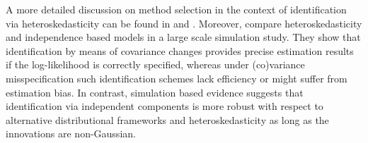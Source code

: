 \documentclass[nojss]{jss}\usepackage[]{graphicx}\usepackage[]{color}
\begin{document}
\begin{savenotes}
\begin{table}[!h]
\caption{\label{tab:ModelChoice} Overview of identification models and respective underlying assumptions on the error term $\varepsilon_t$.}
\end{table}
\end{savenotes}

A more detailed discussion on method selection in the context of identification via heteroskedasticity can be found in \cite{LUTKEPOHL20172} and \cite{LS2018}. Moreover, \cite{HLM2019} compare heteroskedasticity and independence based models in a large scale simulation study. They show that identification by means of covariance changes provides precise estimation results if the log-likelihood is correctly specified, whereas under (co)variance misspecification such identification schemes lack efficiency or might suffer from estimation bias. In contrast, simulation based evidence suggests that identification via independent components is more robust with respect to alternative distributional frameworks and heteroskedasticity as long as the innovations are non-Gaussian.
\end{document}

